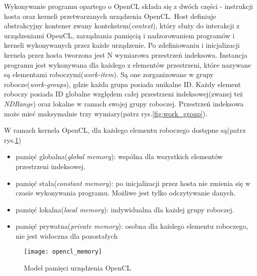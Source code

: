\documentclass[document.tex]{subfiles}
\begin{document}
\indent Wykonywanie programu opartego o OpenCL składa się z dwóch części - instrukcji hosta oraz kerneli przetwarzanych urządzenia OpenCL. Host definiuje abstrakcyjny kontener zwany kontekstem(\textit{context}),
który służy do interakcji z urządzeniami OpenCL, zarządzania pamięcią i nadzorowaniem programów i kerneli
wykonywanych przez każde urządzenie. 
Po zdefiniowaniu i inicjalizacji kernela przez hosta
tworzona jest N wymiarowa przestrzeń indeksowa. Instancja
programu jest wykonywana dla każdego z elementów przestrzeni, które nazywane są elementami roboczymi(\textit{work-item}). Są one zorganizowane
w grupy robocze(\textit{work-groups}), gdzie każda grupa posiada unikalne ID. Każdy element roboczy posiada ID globalne względem całej przestrzeni indeksowej(zwanej też \textit{NDRange}) oraz lokalne w ramach swojej grupy roboczej. Przestrzeń indeksowa może mieć maksymalnie trzy wymiary(patrz rys.\ref{fig:work_group}).\cite{OpenCL_Gaster}\cite{OpenCL_spec}\cite{OpenCL_Banger}

\indent W ramach kernela OpenCL, dla każdego elementu
roboczego dostępne są(patrz rys.\ref{fig:opencl_memory})
\begin{itemize}
\item pamięć globalna(\textit{global memory}): wspólna dla wszystkich elementów przestrzeni indeksowej.
\item pamięć stała(\textit{constant memory}): po inicjalizacji przez hosta nie zmienia się w czasie wykonywania programu. Możliwe jest tylko odczytywanie danych.
\item pamięć lokalna(\textit{local memory}): indywidualna dla każdej grupy roboczej.
\item pamięć prywatna(\textit{private memory}): osobna dla każdego elementu roboczego, nie jest widoczna dla pozostałych
\end{itemize}

\begin{figure}[h]
\texttt{[image: opencl\_memory]}
\caption{Model pamięci urządzenia OpenCL \protect\cite{OpenCL_spec}}
\label{fig:opencl_memory}
\end{figure}
\end{document}
